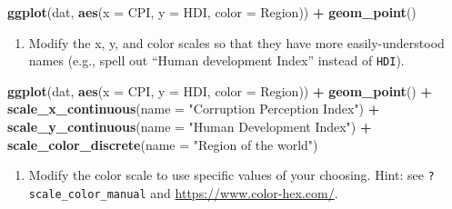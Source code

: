 \documentclass[]{book}
\newenvironment{Shaded}{\begin{snugshade}}{\end{snugshade}}
\newcommand{\KeywordTok}[1]{\textcolor[rgb]{0.13,0.29,0.53}{\textbf{#1}}}
\newcommand{\DataTypeTok}[1]{\textcolor[rgb]{0.13,0.29,0.53}{#1}}
\newcommand{\StringTok}[1]{\textcolor[rgb]{0.31,0.60,0.02}{#1}}
\newcommand{\OperatorTok}[1]{\textcolor[rgb]{0.81,0.36,0.00}{\textbf{#1}}}
\newcommand{\NormalTok}[1]{#1}
\providecommand{\tightlist}{%
  \setlength{\itemsep}{0pt}\setlength{\parskip}{0pt}}
\begin{document}
\begin{Shaded}
\begin{Highlighting}[]
\KeywordTok{ggplot}\NormalTok{(dat, }\KeywordTok{aes}\NormalTok{(}\DataTypeTok{x =}\NormalTok{ CPI, }\DataTypeTok{y =}\NormalTok{ HDI, }\DataTypeTok{color =}\NormalTok{ Region)) }\OperatorTok{+}
\StringTok{  }\KeywordTok{geom_point}\NormalTok{()}
\end{Highlighting}
\end{Shaded}

\begin{enumerate}
\def\labelenumi{\arabic{enumi}.}
\setcounter{enumi}{1}
\tightlist
\item
  Modify the x, y, and color scales so that they have more
  easily-understood names (e.g., spell out ``Human development Index''
  instead of \texttt{HDI}).
\end{enumerate}

\begin{Shaded}
\begin{Highlighting}[]
\KeywordTok{ggplot}\NormalTok{(dat, }\KeywordTok{aes}\NormalTok{(}\DataTypeTok{x =}\NormalTok{ CPI, }\DataTypeTok{y =}\NormalTok{ HDI, }\DataTypeTok{color =}\NormalTok{ Region)) }\OperatorTok{+}
\KeywordTok{geom_point}\NormalTok{() }\OperatorTok{+}
\KeywordTok{scale_x_continuous}\NormalTok{(}\DataTypeTok{name =} \StringTok{"Corruption Perception Index"}\NormalTok{) }\OperatorTok{+}
\KeywordTok{scale_y_continuous}\NormalTok{(}\DataTypeTok{name =} \StringTok{"Human Development Index"}\NormalTok{) }\OperatorTok{+}
\KeywordTok{scale_color_discrete}\NormalTok{(}\DataTypeTok{name =} \StringTok{"Region of the world"}\NormalTok{)}
\end{Highlighting}
\end{Shaded}

\begin{enumerate}
\def\labelenumi{\arabic{enumi}.}
\setcounter{enumi}{2}
\tightlist
\item
  Modify the color scale to use specific values of your choosing. Hint:
  see \texttt{?scale\_color\_manual} and
  \url{https://www.color-hex.com/}.
\end{enumerate}
\end{document}
